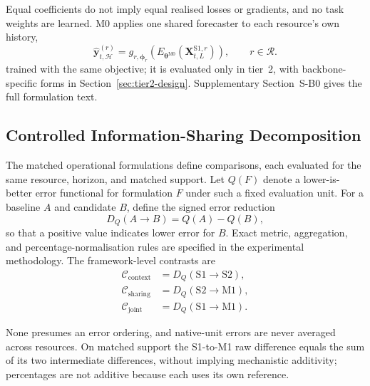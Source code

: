 \documentclass[5p,twocolumn]{elsarticle}
\begin{document}
Equal coefficients do not imply equal realised losses or gradients, and no
task weights are learned. M0 applies one shared forecaster to each resource's
own history,
\begin{equation}
  \widehat{\mathbf{y}}_{t,\mathcal{H}}^{(r)}
  = g_{r,\boldsymbol{\phi}_r}\!\left(
      E_{\boldsymbol{\theta}^{\mathrm{M0}}}
      (\mathbf{X}_{t,L}^{\mathrm{S1},r})\right),
  \qquad r\in\mathcal{R}.
  \label{eq:m0-forecast}
\end{equation}
trained with the same objective; it is evaluated only in tier~2, with
backbone-specific forms in Section~\ref{sec:tier2-design}. Supplementary
Section~S-B0 gives the full formulation text.

\subsection{Controlled Information-Sharing Decomposition}
\label{sec:decomposition}

The matched operational formulations define comparisons, each evaluated for the same
resource, horizon, and matched support. Let $Q(F)$ denote a lower-is-better
error functional for formulation $F$ under such a fixed evaluation unit. For
a baseline $A$ and candidate $B$, define the signed error reduction
\begin{equation}
  D_Q(A\rightarrow B)=Q(A)-Q(B),
  \label{eq:controlled-reduction}
\end{equation}
so that a positive value indicates lower error for $B$. Exact metric,
aggregation, and percentage-normalisation rules are specified in the
experimental methodology. The framework-level contrasts are
\begin{equation}
  \begin{aligned}
    \mathcal{C}_{\mathrm{context}}
      &= D_Q(\mathrm{S1}\rightarrow\mathrm{S2}), \\
    \mathcal{C}_{\mathrm{sharing}}
      &= D_Q(\mathrm{S2}\rightarrow\mathrm{M1}), \\
    \mathcal{C}_{\mathrm{joint}}
      &= D_Q(\mathrm{S1}\rightarrow\mathrm{M1}).
  \end{aligned}
  \label{eq:controlled-contrasts}
\end{equation}

None presumes an error ordering, and native-unit errors are never averaged
across resources. On matched support the S1-to-M1 raw difference equals the
sum of its two intermediate differences, without implying mechanistic
additivity; percentages are not additive because each uses its own reference.
\end{document}
